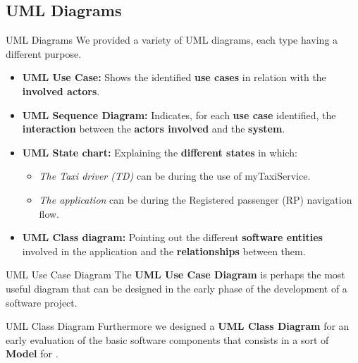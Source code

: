 \documentclass{../common/latex_classes/pdf_presentation}
\begin{document}
	\subsection{UML Diagrams}
	\begin{frame}{UML Diagrams}
		We provided a variety of UML diagrams, each type having a different purpose.
		\begin{itemize}
			\item\textbf{UML Use Case:} Shows the identified \textbf{use cases} in relation with the \textbf{involved actors}.
			\item\textbf{UML Sequence Diagram:} Indicates, for each \textbf{use case} identified, the \textbf{interaction} between the \textbf{actors involved} and the \textbf{system}.
			\item\textbf{UML State chart:} Explaining the \textbf{different states} in which:
			\begin{itemize}
				\item\textit{The Taxi driver (TD)} can be during the use of myTaxiService.
				\item\textit{The application} can be during the Registered passenger (RP) navigation flow.
			\end{itemize}
			\item\textbf{UML Class diagram:} Pointing out the different \textbf{software entities} involved in the application and the \textbf{relationships} between them.
		\end{itemize}
	\end{frame}
	\begin{frame}{UML Use Case Diagram}
		The \textbf{UML Use Case Diagram} is perhaps the most useful diagram that can be designed in the early phase of the development of a software project.
	\end{frame}
	\begin{frame}{UML Class Diagram}
		Furthermore we designed a \textbf{UML Class Diagram} for an early evaluation of the basic software components that consists in a sort of \textbf{Model} for \myTaxiService{}.
	\end{frame}
\end{document}
